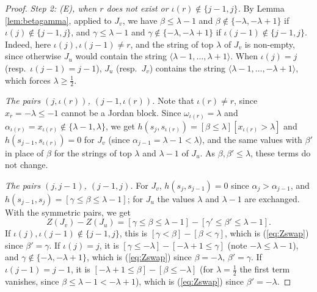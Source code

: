 \documentclass[a4paper,12pt,leqno]{amsart}
\theoremstyle{plain}
\theoremstyle{definition}
\begin{document}
\begin{proof}
\emph{Step 2: (E), when $r$ does not exist or $\iota(r)\notin\{j-1,j\}$.} By Lemma
\ref{lem:betagamma}, applied to $J_v$, we have $\beta\leq\lambda-1$ and $\beta\notin\{-\lambda,-\lambda+1\}$ if
$\iota(j)\notin\{j-1,j\}$, and $\gamma\leq\lambda-1$ and $\gamma\notin\{-\lambda,-\lambda+1\}$ if
$\iota(j-1)\notin\{j-1,j\}$. Indeed, here $\iota(j),\iota(j-1)\neq r$, and the string of top $\lambda$ of
$J_v$ is non-empty, since otherwise $J_u$ would contain the string $\langle\lambda-1,\ldots,\lambda+1\rangle$.
When $\iota(j)=j$ (resp.\ $\iota(j-1)=j-1$), $J_u$ (resp.\ $J_v$) contains the string
$\langle\lambda-1,\ldots,-\lambda+1\rangle$, which forces $\lambda\geq\tfrac12$.

\emph{The pairs $(j,\iota(r))$, $(j-1,\iota(r))$.} Note that $\iota(r)\neq r$, since $x_r=-\lambda\leq-1$
cannot be a Jordan block. Since $\omega_{\iota(r)}=\lambda$ and $\alpha_{\iota(r)}=x_{\iota(r)}\notin
\{\lambda-1,\lambda\}$, we get $h(s_j,s_{\iota(r)})=[\beta\leq\lambda][x_{\iota(r)}>\lambda]$ and
$h(s_{j-1},s_{\iota(r)})=0$ for $J_v$ (since $\alpha_{j-1}=\lambda-1<\lambda$), and the same values with
$\beta'$ in place of $\beta$ for the strings of top $\lambda$ and $\lambda-1$ of $J_u$. As
$\beta,\beta'\leq\lambda$, these terms do not change.

\emph{The pairs $(j,j-1)$, $(j-1,j)$.} For $J_v$, $h(s_j,s_{j-1})=0$ since $\alpha_j>\alpha_{j-1}$, and
$h(s_{j-1},s_j)=[\gamma\leq\beta\leq\lambda-1]$; for $J_u$ the values $\lambda$ and $\lambda-1$ are
exchanged. With the symmetric pairs, we get
\[Z(J_v)-Z(J_u)=[\gamma\leq\beta\leq\lambda-1]-[\gamma'\leq\beta'\leq\lambda-1].\]
If $\iota(j),\iota(j-1)\notin\{j-1,j\}$, this is $[\gamma<\beta]-[\beta<\gamma]$, which is
(\ref{eq:Zswap}) since $\beta'=\gamma$. If $\iota(j)=j$, it is $[\gamma\leq-\lambda]-[-\lambda+1\leq
\gamma]$ (note $-\lambda\leq\lambda-1$), and $\gamma\notin\{-\lambda,-\lambda+1\}$, which is
(\ref{eq:Zswap}) since $\beta=-\lambda$, $\beta'=\gamma$. If $\iota(j-1)=j-1$, it is $[-\lambda+1\leq\beta]
-[\beta\leq-\lambda]$ (for $\lambda=\tfrac12$ the first term vanishes, since $\beta\leq\lambda-1<-\lambda+1$),
which is (\ref{eq:Zswap}) since $\beta'=-\lambda$.


\end{proof}
\end{document}
